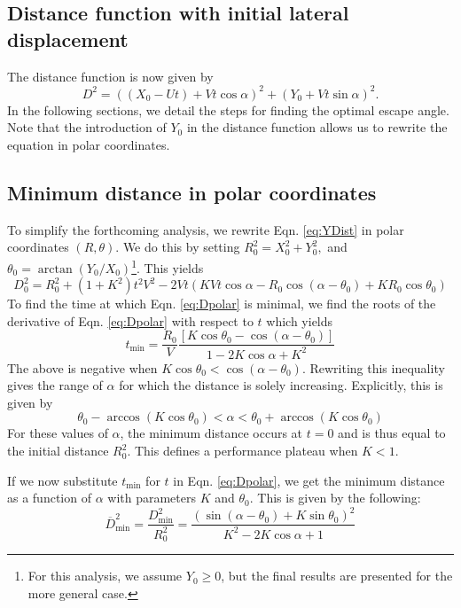 \documentclass[12pt]{article}
\def\ds{\displaystyle}
\newcommand{\ol}{\overline}
\begin{document}
\subsection{Distance function with initial lateral displacement}
The distance function is now given by    
%
\begin{equation}
D^2 = ((X_0 - Ut) + Vt\cos\alpha)^2 + (Y_0 + Vt\sin\alpha)^2.
\label{eq:YDist}
\end{equation}
%
In the following sections, we detail the steps for finding the optimal escape angle. Note that the introduction of $Y_0$ in the distance function allows us to rewrite the equation in polar coordinates. 

\subsection{Minimum distance in polar coordinates}
To simplify the forthcoming analysis, we rewrite Eqn. \ref{eq:YDist} in polar coordinates $(R,\theta)$. We do this by setting $R_0^2 = X_0^2 + Y_0^2,$ and $\theta_0 = \arctan(Y_0/X_0)$\footnote{For this analysis, we assume $Y_0 \geq 0$, but the final results are presented for the more general case.}. This yields 
%
\begin{equation}
D_0^2 = R_0^2 + (1 + K^2) t^2 V^2 - 
 2 V t(K V t \cos \alpha  - R_0 \cos(\alpha - \theta_0) + K R_0 \cos \theta_0) 
 \label{eq:Dpolar}
\end{equation}
%
To find the time at which Eqn. \ref{eq:Dpolar} is minimal, we find the roots of the derivative of Eqn. \ref{eq:Dpolar} with respect to $t$ which yields
%
\begin{equation}
t_{\text{min}} = \ds \frac{R_0}{V} \frac{\left[K \cos \theta_0 - \cos(\alpha - \theta_0)\right ]}{1- 2K \cos \alpha + K^2}
\label{eq:tmin}
\end{equation}
%
The above is negative when $K \cos \theta_0 < \cos(\alpha - \theta_0).$ Rewriting this inequality gives the range of $\alpha$ for which the distance is solely increasing. Explicitly, this is given by  
%
\begin{equation}
\theta_0 - \arccos(K \cos \theta_0) < \alpha < \theta_0 + \arccos(K \cos \theta_0)
\label{eq:alphabound}
\end{equation}
%
For these values of $\alpha$, the minimum distance occurs at $t=0$ and is thus equal to the initial distance $R_0^2$. This defines a performance plateau when $K < 1.$

If we now substitute $t_{\text{min}}$ for $t$ in Eqn. \ref{eq:Dpolar}, we get the minimum distance as a function of $\alpha$ with parameters $K$ and $\theta_0$. This is given by the following: 
%
\begin{equation}
\ol{D}^2_{\text{min}}= \ds\frac{{D}^2_{\text{min}}}{R_0^2 }=
\ds\frac{\left ( \sin(\alpha - \theta_0) + K \sin \theta_0 \right )^2}{K^2-2 K \cos \alpha +1} 
\label{eq:Dmin_polar}
\end{equation}
%
\end{document}
